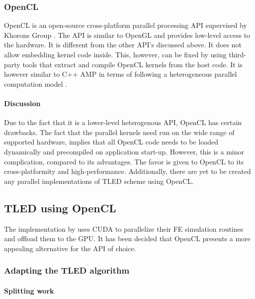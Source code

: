   \subsubsection{OpenCL}

  OpenCL is an open-source cross-platform parallel processing API supervised by Khorons Group \cite{khronos-opencl}. The API is similar to OpenGL and provides low-level access to the hardware. It is different from the other API's discussed above. It does not allow embedding kernel code inside. This, however, can be fixed by using third-party tools \cite{Lawlor2003} that extract and compile OpenCL kernels from the host code. It is however similar to C++ AMP in terms of following a heterogeneous parallel computation model \cite{Stone2010}.

  \paragraph{Discussion} Due to the fact that it is a lower-level heterogenous API, OpenCL has certain drawbacks. The fact that the parallel kernels need run on the wide range of supported hardware, implies that all OpenCL code needs to be loaded dynamically and precompiled on application start-up. However, this is a minor complication, compared to its advantages. The favor is given to OpenCL to its cross-platformity and high-performance. Additionally, there are yet to be created any parallel implementations of TLED scheme using OpenCL.

\subsection{TLED using OpenCL}

  The implementation by \cite{Johnsen2014} uses CUDA to parallelize their FE simulation routines and offload them to the GPU. It has been decided that OpenCL presents a more appealing alternative for the API of choice.

  \subsubsection{Adapting the TLED algorithm}\label{gpu-adapting-tled}

  \paragraph{Splitting work}

